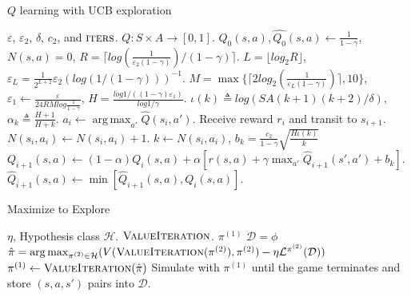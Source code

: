 \documentclass{article}
\theoremstyle{definition}
\DeclareMathOperator*{\argmax}{arg\,max}
\begin{document}
    \begin{algorithm}
        \caption{$ Q $ learning with UCB exploration}
        \label{Q_UCB}
        \begin{algorithmic}[1]
            \Require $ \varepsilon $, $ \varepsilon_2 $, $ \delta $, $ c_2 $,   and   $ \textsc{iters} $.
            \Ensure  $ Q \colon S \times A \rightarrow [0,1] $. 
            \State $ Q_0(s,a), \hat{Q_0}(s,a) \leftarrow \frac{1}{1-\gamma} $, $ N(s,a) = 0 $, $ R = \lceil log(\frac{1}{\varepsilon_2 (1-\gamma)}) / (1-\gamma)  \rceil  $.
            \State $ L = \lfloor log_{2} R \rfloor $, $ \varepsilon_L = \frac{1}{2^{L+2}} \varepsilon_2 (log(1/(1-\gamma)))^{-1} $.
            \State  $ M = \max\{ \lceil 2 log_{2} (\frac{1}{\varepsilon_L (1-\gamma)}) \rceil , 10\} $,  $ \varepsilon_1 \leftarrow \frac{\varepsilon}{24 R M log \frac{1}{1-\gamma}} $, $ H = \frac{log 1/ ((1-\gamma)\varepsilon_1)}{log 1/\gamma} $.  
            \State $ \iota(k) \triangleq log(SA(k+1)(k+2)/\delta) $, $ \alpha_k \triangleq \frac{H+1}{H+k} $.
                \State $a_i \leftarrow \argmax_{a'} \hat{Q}(s_i,a')$.
                \State Receive reward $ r_i $ and transit to $ s_{i+1} $. 
                \State $N(s_i,a_i)\leftarrow N(s_i,a_i) + 1$.
                \State $k \leftarrow N(s_i,a_i)$, $ b_k = \frac{c_2}{1-\gamma} \sqrt{\frac{H\iota(k)}{k}} $ 
                \State  $ Q_{i+1}(s,a) \leftarrow (1-\alpha) Q_{i}(s,a) + \alpha [ r(s,a) + \gamma \max_{a'} \hat{Q}_{i+1}(s',a') + b_k] $.
                \State $  \hat{Q}_{i+1}(s,a) \leftarrow \min[\hat{Q}_{i+1}(s,a),Q_i(s,a)] $.  
            \EndFor
        \end{algorithmic}
    \end{algorithm}

    \begin{algorithm}
        \caption{Maximize to Explore}
        \label{MEX}
        \begin{algorithmic}[1]
            \Require $ \eta $, Hypothesis class $ \mathcal{H} $. $ \textsc{ValueIteration} $.
            \Ensure  $ \pi^{(1)} $ 
            \State $ \mathcal{D} = \phi $ 
                \State  $ \hat{\pi} = \argmax_{\pi^{(2)}\in \mathcal{H}} ( V(\textsc{ValueIteration}(\pi^{(2)}),\pi^{(2)}) - \eta \mathcal{L}^{\pi^{(2)}}(\mathcal{D}) ) $
                \State $  \pi^{(1)} \leftarrow \textsc{ValueIteration}(\hat{\pi}
                ) $ 
                \State Simulate with $ \pi^{(1)} $ until the game terminates and store $ (s,a,s') $ pairs into $ \mathcal{D} $.
            \EndFor
        \end{algorithmic}
    \end{algorithm}
\end{document}
